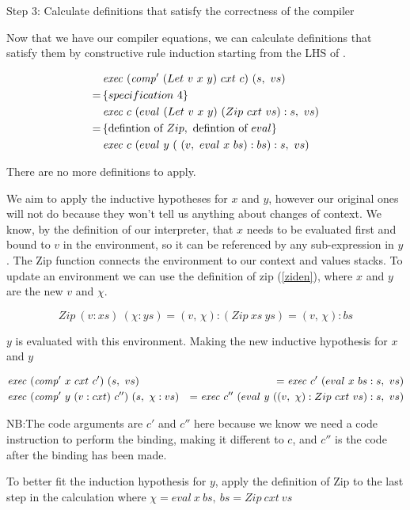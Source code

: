\documentclass {article}
\begin{document}
Step 3: Calculate definitions that satisfy
	the correctness of the compiler

Now that we have our compiler equations,
we can calculate definitions that satisfy
them by constructive rule induction
starting from the LHS of \cite[page 42]{bandh}.

\begin{align*}
	&\mathit{exec\ } (\mathit{comp'\ }  (Let\ v\ x\ y)\ cxt\ c)\ (s,\ vs) \\
	=\, & \{ specification\ 4 \} \\
	&\mathit{exec\ } c\ (eval\ (Let\ v\ x\ y)\ (Zip\ cxt\ vs):s,\ vs) \\
	=\, & \{\mbox{defintion of}\ Zip,\ \mbox{defintion of}\ eval\} \\
	&\mathit{exec\ } c\ (eval\ y\ (\ (v,\ eval\ x\ bs) :bs) : s,\ vs)
\end{align*}

There are no more definitions to apply.

We aim to apply the inductive 
hypotheses for $x$ and $y$,
however our original ones will 
not do because they won't tell us
anything about changes of context.
We know, by the definition of our interpreter,
that $x$ needs to be evaluated first and 
bound to $v$ in the environment, so it can be 
referenced by any sub-expression
in $y$.
The Zip function connects the environment
to our context and values stacks.
To update an environment
we can use the definition of zip (\ref{ziden}),
where $x$ and $y$ are the new $v$ and $\chi$.

\[ Zip\ (v:xs)\ (\chi:ys) = (v,\, \chi):(Zip\ xs\ ys) = (v,\, \chi):bs \]

$y$ is evaluated with this environment.
Making the new inductive hypothesis for $x$ and $y$

\begin{eqnarray*}
	&\Exec (\Compp  x\ cxt\ c')\ (s,\ vs)
		&= \Exec c'\ (eval\ x\ bs : s,\ vs)\\
	&\Exec (\Compp  y\ (v:cxt)\ c'')\ (s,\ \chi : vs) 
		&= \Exec c''\ (eval\ y\ 
					(
					(v,\ \chi) : Zip\ cxt\ vs) : s,\ vs
					)\\
\end{eqnarray*}

NB:The code arguments are $c'$ and $c''$ 
here because we know we need a code instruction
to perform the binding, making it different to $c$,
and $c''$ is the code after the binding has been made.

To better fit the induction hypothesis for $y$,
apply the definition of Zip to the last step in the calculation
where \( \chi = eval\ x\ bs,\ bs = Zip\ cxt\ vs \)
\end{document}
